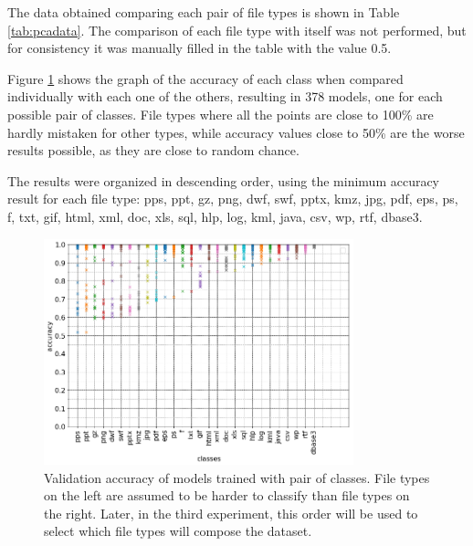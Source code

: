 The data obtained comparing each pair of file types is shown in Table \ref{tab:pcadata}. The comparison of each file type with itself was not performed, but for consistency it was manually filled in the table with the value 0.5.

Figure \ref{fig:dual} shows the graph of the accuracy of each class when compared individually with each one of the others, resulting in 378 models, one for each possible pair of classes. File types where all the points are close to 100\% are hardly mistaken for other types, while accuracy values close to 50\% are the worse results possible, as they are close to random chance.

The results were organized in descending order, using the minimum accuracy result for each file type: pps, ppt, gz, png, dwf, swf, pptx, kmz, jpg, pdf, eps, ps, f, txt, gif, html, xml, doc, xls, sql, hlp, log, kml, java, csv, wp, rtf, dbase3.

\noindent
\begin{figure}[htb!]
\centering\includegraphics[width=0.8\textwidth]{dual.png}
\caption{\label{fig:dual}Validation accuracy of models trained with pair of classes. File types on the left are assumed to be harder to classify than file types on the right. Later, in the third experiment, this order will be used to select which file types will compose the dataset.}%
\end{figure}

